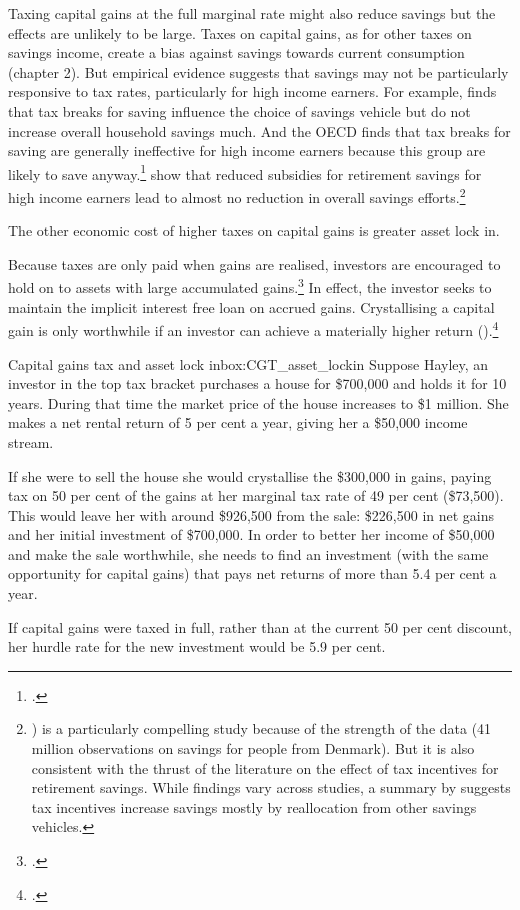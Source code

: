 \documentclass{grattan}\usepackage[]{graphicx}\usepackage[]{color}
\begin{document}
Taxing capital gains at the full marginal rate might also reduce savings but the effects are unlikely to be large. Taxes on capital gains, as for other taxes on savings income, create a bias against savings towards current consumption (chapter 2).  But empirical evidence suggests that savings may not be particularly responsive to tax rates, particularly for high income earners. For example, \textcite{Engen1996} finds that tax breaks for saving influence the choice of savings vehicle but do not increase overall household savings much. And the OECD finds that tax breaks for saving are generally ineffective for high income earners because this group are likely to save anyway.\footcite{OECD2007}  \textcite{chetty2013subsidies} show that reduced subsidies for retirement savings for high income earners lead to almost no reduction in overall savings efforts.\footnote{\textcite{chetty2013subsidies} ) is a particularly compelling study because of the strength of the data (41 million observations on savings for people from Denmark). But it is also consistent with the thrust of the literature on the effect of tax incentives for retirement savings. While findings vary across studies, a summary by \textcite{Antolin} suggests tax incentives increase savings mostly by reallocation from other savings vehicles. }

The other economic cost of higher taxes on capital gains is greater asset lock in. 

Because taxes are only paid when gains are realised, investors are encouraged to hold on to assets with large accumulated gains.\footcite[p.~69]{Burman2009} In effect, the investor seeks to maintain the implicit interest free loan on accrued gains. Crystallising a capital gain is only worthwhile if an investor can achieve a materially higher return ().\footcite[p.~12]{Ingles2009} 

\begin{smallbox}{Capital gains tax and asset lock in}{box:CGT_asset_lockin}
Suppose Hayley, an investor in the top tax bracket purchases a house for \$700,000 and holds it for 10 years. During that time the market price of the house increases to \$1 million. She makes a net rental return of 5 per cent a year, giving her a \$50,000 income stream. 

If she were to sell the house she would crystallise the \$300,000 in gains, paying tax on 50 per cent of the gains at her marginal tax rate of 49 per cent (\$73,500). This would leave her with around \$926,500 from the sale: \$226,500 in net gains and her initial investment of \$700,000. In order to better her income of \$50,000 and make the sale worthwhile, she needs to find an investment (with the same opportunity for capital gains) that pays net returns of more than 5.4 per cent a year.

If capital gains were taxed in full, rather than at the current 50 per cent discount, her hurdle rate for the new investment would be 5.9 per cent. 
\end{smallbox}
\end{document}
